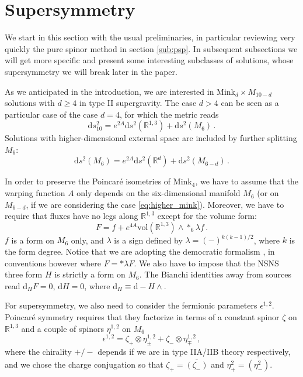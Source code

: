 \documentclass[12pt]{article}
\newcommand{\R}{\mathbb{R}}
\newcommand{\dd}{\mathrm{d}}
\newcommand{\vol}{\mathrm{vol}}
\begin{document}
\section{Supersymmetry} \label{sec:susy}

We start in this section with the usual preliminaries, in particular reviewing very quickly the pure spinor method in section \ref{sub:psp}. In subsequent subsections we will get more specific and present some interesting subclasses of solutions, whose supersymmetry we will break later in the paper.

As we anticipated in the introduction, we are interested in Mink$_d\times M_{10-d}$ solutions with $d \ge 4$ in type II supergravity. The case $d>4$ can be seen as a particular case of the case $d=4$, for which the metric reads 
\begin{equation}
\label{eq:metric_mink4}
\dd s^2_{10} = e^{2A}\dd s^2(\R^{1,3}) + \dd s^2(M_6)\,.
\end{equation} 
Solutions with higher-dimensional external space are included by further splitting $M_6$:
\begin{equation}
\label{eq:higher_mink}
\dd s^2(M_6) = e^{2A}\dd s^2(\R^{d}) + \dd s^2(M_{6-d}) \, .
\end{equation}

In order to preserve the Poincar\'e isometries of Mink$_4$, we have to assume that the warping function $A$ only depends on the six-dimensional manifold $M_6$ (or on $M_{6-d}$, if we are considering the case \eqref{eq:higher_mink}). Moreover, we have to require that fluxes have no legs along $\R^{1,3}$ except for the volume form:
\begin{equation}
F= f + e^{4A} \vol(\R^{1,3}) \wedge *_6 \lambda f\,.
\end{equation}
$f$ is a form on $M_6$ only, and $\lambda$ is a sign defined by $\lambda=(-)^{k(k-1)/2}$, where $k$ is the form degree. Notice that we are adopting the democratic formalism \cite{democratic}, in conventions however where $F= * \lambda F$. We also have to impose that the NSNS three form $H$ is strictly a form on $M_6$. The Bianchi identities away from sources read $\dd_H F=0$, $\dd H=0$,
where $\dd_H\equiv \dd - H \wedge$.

For supersymmetry, we also need to consider the fermionic parameters $\epsilon^{1,2}$. Poincar\'e symmetry requires that they factorize in terms of a constant spinor $\zeta$ on $\R^{1,3}$ and a couple of spinors $\eta^{1,2}$ on $M_6$
\begin{equation}\label{eq:eps-zeta}
\epsilon^{1,2} = \zeta_+ \otimes \eta^{1,2}_\pm + \zeta_- \otimes \eta^{1,2}_\mp \, ,
\end{equation} 
where the chirality $+/-$ depends if we are in type IIA/IIB theory respectively, and we chose the charge conjugation so that $\zeta_+ = \overline{(\zeta_-)}$ and $\eta^2_+= \overline{(\eta^2_-)}$.
\end{document}
